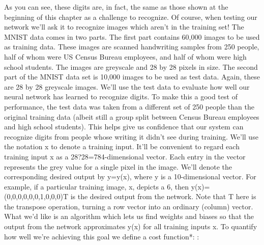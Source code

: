 As you can see, these digits are, in fact, the same as those shown at the beginning of this chapter as a challenge to recognize. Of course, when testing our network we'll ask it to recognize images which aren't in the training set!
The MNIST data comes in two parts. The first part contains 60,000 images to be used as training data. These images are scanned handwriting samples from 250 people, half of whom were US Census Bureau employees, and half of whom were high school students. The images are greyscale and 28 by 28 pixels in size. The second part of the MNIST data set is 10,000 images to be used as test data. Again, these are 28 by 28 greyscale images. We'll use the test data to evaluate how well our neural network has learned to recognize digits. To make this a good test of performance, the test data was taken from a different set of 250 people than the original training data (albeit still a group split between Census Bureau employees and high school students). This helps give us confidence that our system can recognize digits from people whose writing it didn't see during training.
We'll use the notation x to denote a training input. It'll be convenient to regard each training input x as a 28?28=784-dimensional vector. Each entry in the vector represents the grey value for a single pixel in the image. We'll denote the corresponding desired output by y=y(x), where y is a 10-dimensional vector. For example, if a particular training image, x, depicts a 6, then y(x)=(0,0,0,0,0,0,1,0,0,0)T is the desired output from the network. Note that T here is the transpose operation, turning a row vector into an ordinary (column) vector.
What we'd like is an algorithm which lets us find weights and biases so that the output from the network approximates y(x) for all training inputs x. To quantify how well we're achieving this goal we define a cost function*:
 :


